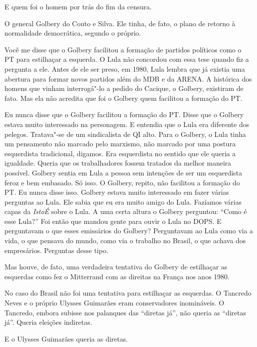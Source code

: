 \falaG E quem foi o homem por trás do fim da censura.

\falaM O general Golbery do Couto e Silva. Ele tinha, de fato, o plano de
retorno à normalidade democrática, segundo o próprio.

\falaG Você me disse que o Golbery facilitou a formação de partidos
políticos como o PT para estilhaçar a esquerda. O Lula não concordou com
essa tese quando fiz a pergunta a ele. Antes de ele ser preso, em 1980,
Lula lembra que já existia uma abertura para formar novos partidos além
do MDB e da ARENA. A histórica dos homens que vinham interrogá"-lo a
pedido do Cacique, o Golbery, existiram de fato. Mas ela não acredita
que foi o Golbery quem facilitou a formação do PT.

\falaM Eu nunca disse que o Golbery facilitou a formação do PT. Disse que o
Golbery estava muito interessado na personagem. E entendia que o Lula
era diferente dos pelegos. Tratava"-se de um sindicalista de QI alto.
Para o Golbery, o Lula tinha um pensamento não marcado pelo marxismo,
não marcado por uma postura esquerdista tradicional, digamos. Era
esquerdista no sentido que ele queria a igualdade. Queria que os
trabalhadores fossem tratados da melhor maneira possível. Golbery sentia
em Lula a pessoa sem intenções de ser um esquerdista feroz e bem
embasado. Só isso. O Golbery, repito, não facilitou a formação do PT. Eu
nunca disse isso. Golbery estava muito interessado em fazer várias
perguntas ao Lula. Ele sabia que eu era muito amigo do Lula. Fazíamos
várias capas da \emph{IstoÉ} sobre o Lula. A uma certa altura o Golbery
perguntou: ``Como é esse Lula?'' Foi então que mandou gente para ouvir o
Lula no DOPS. E perguntavam o que esses emissários do Golbery?
Perguntavam ao Lula como via a vida, o que pensava do mundo, como via o
trabalho no Brasil, o que achava dos empresários. Perguntas desse tipo.

\falaG Mas houve, de fato, uma verdadeira tentativa do Golbery de estilhaçar
as esquerdas como fez o Mitterrand com as direitas na França nos anos
1980.

\falaM No caso do Brasil não foi uma tentativa para estilhaçar as esquerdas.
O Tancredo Neves e o próprio Ulysses Guimarães eram conservadores
inomináveis. O Tancredo, embora subisse nos palanques das ``diretas
já'', não queria as ``diretas já''. Queria eleições indiretas.

\falaG E o Ulysses Guimarães queria as diretas.

